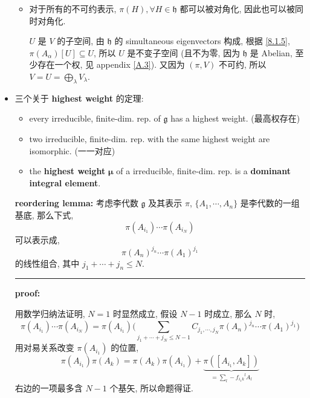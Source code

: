 \begin{itemize}
\begin{itemize}
		\item 对于所有的不可约表示, $\pi(H), \forall H \in \mathfrak{h}$ 都可以被对角化, 因此也可以被同时对角化.
		
		\begin{tcolorbox}[title=proof:]
			$U$ 是 $V$ 的子空间, 由 $\mathfrak{h}$ 的 simultaneous eigenvectors 构成, 根据 \eqref{8.1.5}, $\pi(A_\alpha)[U] \subseteq U$, 所以 $U$ 是不变子空间 (且不为零, 因为 $\mathfrak{h}$ 是 Abelian, 至少存在一个权, 见 appendix \ref{A.3}). 又因为 $(\pi, V)$ 不可约, 所以 $V = U = \bigoplus_\lambda V_\lambda$.
		\end{tcolorbox}
	\end{itemize}
	
	\item 三个关于 \textbf{highest weight} 的定理:
	\begin{itemize}
		\item every irreducible, finite-dim. rep. of $\mathfrak{g}$ has a highest weight. (最高权存在)
		
		\item two irreducible, finite-dim. rep. with the same highest weight are isomorphic. (一一对应)
		
		\item the \textbf{highest weight} $\boldsymbol{\mu}$ of a irreducible, finite-dim. rep. is a \textbf{dominant integral element}.
	\end{itemize}
	
	\begin{tcolorbox}[title=proof:]
		\textbf{reordering lemma:} 考虑李代数 $\mathfrak{g}$ 及其表示 $\pi$, $\{A_1, \cdots, A_n\}$ 是李代数的一组基底, 那么下式,
		\begin{equation}
			\pi(A_{i_1}) \cdots \pi(A_{i_N})
		\end{equation}
		可以表示成,
		\begin{equation} \label{8.1.7}
			\pi(A_n)^{j_n} \cdots \pi(A_1)^{j_1}
		\end{equation}
		的线性组合, 其中 $j_1 + \cdots + j_n \leq N$.
		
		\noindent\rule[0.5ex]{\linewidth}{0.5pt} %
		
		\textbf{proof:}
		
		用数学归纳法证明, $N = 1$ 时显然成立, 假设 $N - 1$ 时成立, 那么 $N$ 时,
		\begin{equation}
			\pi(A_{i_1}) \cdots \pi(A_{i_N}) = \pi(A_{i_1}) \Big( \sum_{j_1 + \cdots + j_N \leq N - 1} C_{j_1, \cdots, j_N} \pi(A_n)^{j_n} \cdots \pi(A_1)^{j_1} \Big)
		\end{equation}
		用对易关系改变 $\pi(A_{i_1})$ 的位置,
		\begin{equation}
			\pi(A_{i_1}) \pi(A_k) = \pi(A_k) \pi(A_{i_1}) + \underbrace{\pi([A_{i_1}, A_k])}_{= \sum_l - {f_{i_1 k}}^l A_l}
		\end{equation}
		右边的一项最多含 $N - 1$ 个基矢, 所以命题得证.
		

\end{tcolorbox}
\end{itemize}
